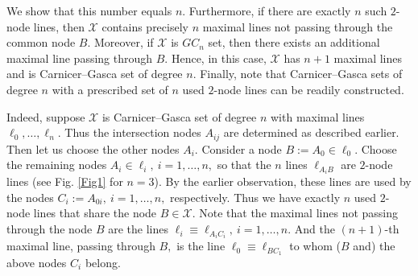 \documentclass[a4paper,12pt]{article}
\theoremstyle{definition}
\numberwithin{equation}{section}
\numberwithin{figure}{section}
\newcommand{\Xset}{\mathcal{X}}
\begin{document}
 
We show that this number equals $n$. Furthermore, if there are exactly $n$ such $2$-node lines, then $\mathcal{X}$ contains precisely $n$ maximal lines not passing through the common node $B$. Moreover, if $\mathcal{X}$ is $GC_n$ set, then there exists an additional maximal line passing through $B$. Hence, in this case, $\mathcal{X}$ has $n+1$ maximal lines and is Carnicer–Gasca set of degree $n$. Finally, note that Carnicer–Gasca sets of degree $n$ with a prescribed set of $n$ used $2$-node lines can be readily constructed.

Indeed, suppose $\mathcal{X}$ is Carnicer–Gasca set of degree $n$ with  maximal lines $\ell_0,\ldots,\ell_n.$ Thus the intersection nodes $A_{ij}$  are determined as described earlier. Then let us choose the other nodes $A_i.$ Consider a node $B := A_0 \in \ell_0.$ Choose the remaining nodes $A_i \in \ell_i,\ i=1,\ldots,n,$ so that the $n$ lines $\ell_{A_iB}$ are $2$-node lines (see Fig. \ref{Fig1} for $n=3$). 
By the earlier observation, these lines are used by the nodes $C_i:=A_{0i},\ i=1,\ldots,n,$ respectively. Thus we have exactly $n$ used $2$-node lines that share the node $B\in\Xset.$ Note that the maximal lines not passing through the node $B$ are the lines $\ell_i\equiv\ell_{A_iC_i},\ i=1,\ldots,n.$ And the $(n+1)$-th maximal line, passing through $B,$ is the line $\ell_0\equiv\ell_{BC_1}$ to whom ($B$ and) the above nodes $C_i$ belong. 
\end{document}
